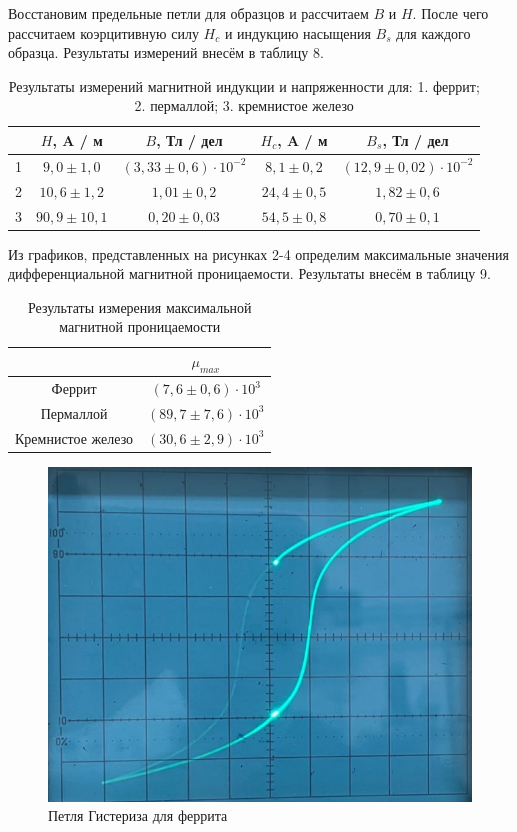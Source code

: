 \documentclass[a4paper]{article}
\theoremstyle{definition}
\theoremstyle{remark}
\begin{document}
Восстановим предельные петли для образцов и рассчитаем $B$ и $H$. После чего рассчитаем коэрцитивную силу $H_{c}$ и индукцию насыщения $B_{s}$ для каждого образца. Результаты измерений внесём в таблицу 8.

\begin{table}[h!]
    \centering
    \caption{Результаты измерений магнитной индукции и напряженности для: 1. феррит; 2. пермаллой; 3. кремнистое железо}
    \begin{tabular}{|c|c|c|c|c|}
    \hline
      & $H$, A / м             & $B$, Тл / дел                            & $H_c$, A / м           & $B_s$, Тл / дел                            \\ \hline
    1 & $9,0 \pm 1,0$   & $(3,33 \pm 0,6) \cdot 10^{-2}$ & $8,1 \pm 0,2$  & $(12,9 \pm 0,02) \cdot 10^{-2}$ \\ \hline
    2 & $10,6 \pm 1,2$  & $1,01 \pm 0,2$                 & $24,4 \pm 0,5$ & $1,82 \pm 0,6$                  \\ \hline
    3 & $90,9 \pm 10,1$ & $0,20 \pm 0,03$                & $54,5 \pm 0,8$ & $0,70 \pm 0,1$                  \\ \hline
    \end{tabular}
    \end{table}

Из графиков, представленных на рисунках 2-4 определим максимальные значения дифференциальной магнитной проницаемости. Результаты внесём в таблицу 9.

\begin{table}[h!]
    \centering
    \caption{Результаты измерения максимальной магнитной проницаемости}
    \begin{tabular}{|c|c|}
    \hline
                      & $\mu_{max}$                \\ \hline
    Феррит            & $(7,6 \pm 0,6)\cdot 10^3$  \\ \hline
    Пермаллой         & $(89,7 \pm 7,6)\cdot 10^3$ \\ \hline
    Кремнистое железо & $(30,6 \pm 2,9)\cdot 10^3$ \\ \hline
    \end{tabular}
    \end{table}

    \begin{figure}[h!]
        \centering
        \includegraphics[width=0.5\linewidth]{image/ferrit.png}
        \caption{Петля Гистериза для феррита}
    \end{figure}
\end{document}
